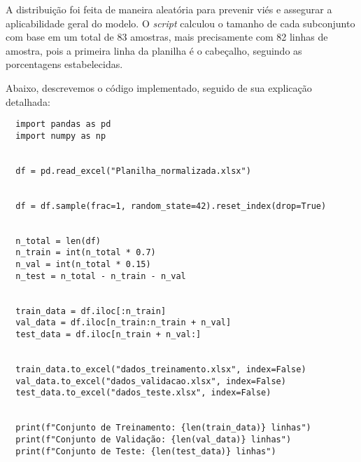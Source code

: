 A distribuição foi feita de maneira aleatória para prevenir viés e assegurar a aplicabilidade geral do modelo. O \textit{script} calculou o tamanho de cada subconjunto com base em um total de 83 amostras, mais precisamente com 82 linhas de amostra, pois a primeira linha da planilha é o cabeçalho, seguindo as porcentagens estabelecidas.

Abaixo, descrevemos o código implementado, seguido de sua explicação detalhada:

\begin{lstlisting}
  import pandas as pd
  import numpy as np
  
  
  df = pd.read_excel("Planilha_normalizada.xlsx")
  
  
  df = df.sample(frac=1, random_state=42).reset_index(drop=True)
  
  
  n_total = len(df)
  n_train = int(n_total * 0.7)
  n_val = int(n_total * 0.15)
  n_test = n_total - n_train - n_val
  
  
  train_data = df.iloc[:n_train]
  val_data = df.iloc[n_train:n_train + n_val]
  test_data = df.iloc[n_train + n_val:]
  
  
  train_data.to_excel("dados_treinamento.xlsx", index=False)
  val_data.to_excel("dados_validacao.xlsx", index=False)
  test_data.to_excel("dados_teste.xlsx", index=False)
  
  
  print(f"Conjunto de Treinamento: {len(train_data)} linhas")
  print(f"Conjunto de Validação: {len(val_data)} linhas")
  print(f"Conjunto de Teste: {len(test_data)} linhas")
\end{lstlisting}  

